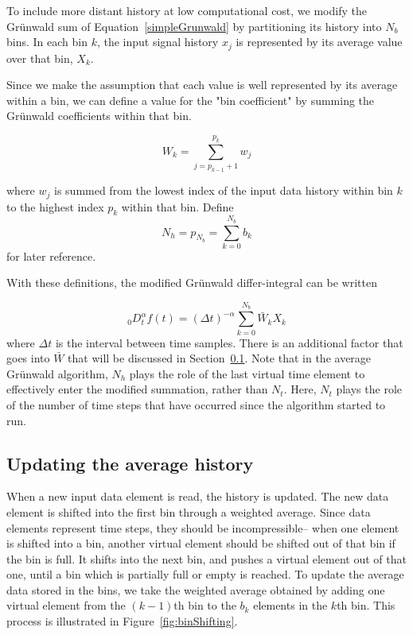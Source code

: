 To include more distant history at low computational cost, we modify
the Gr{\"u}nwald sum of Equation~\ref{simpleGrunwald} by partitioning its
history into $N_b$ bins. In each bin $k$, the input signal history
$x_j$ is represented by its average value over that bin, $X_k$.

Since we make the assumption that each value is well represented by
its average within a bin, we can define a value for the "bin
coefficient" by summing the Gr{\"u}nwald coefficients within that bin.

\begin{equation}
W_k = \displaystyle\sum\limits_{j=p_{k-1}+1}^{p_k} w_j
\label{eqn:sumWk}
\end{equation}

\noindent where $w_j$ is summed from the lowest index of the input data history within bin $k$ to the highest index $p_k$ within that bin. Define
\begin{equation}
N_h=p_{N_b}=\displaystyle\sum_{k=0}^{N_b}b_k
\label{eqn:Nh}
\end{equation}
for later reference. 

With these definitions, the modified Gr{\"u}nwald differ-integral can be written

\begin{equation}
_0D^\alpha_t f(t) = \displaystyle(\Delta t)^{-\alpha}\sum\limits_{k=0}^{N_b}\bar{W}_kX_k
\label{avgSimpleGrunwald}
\end{equation}
where $\Delta t$ is the interval between time samples. There is an additional factor that goes into $\bar{W}$ that will be discussed in Section~\ref{sec:shifting}. Note that in the average Gr{\"u}nwald algorithm, $N_h$ plays the role of the last virtual time element to effectively enter the modified summation, rather than $N_t$. Here, $N_t$ plays the role of the number of time steps that have occurred since the algorithm started to run. 



\subsection{Updating the average history}
\label{sec:shifting}

When a new input data element is read, the history is updated. The new data element is shifted into the first bin through a weighted average. Since data elements represent time steps, they should be incompressible-- when one element is shifted into a bin, another virtual element should be shifted out of that bin if the bin is full. It shifts into the next bin, and pushes a virtual element out of that one, until a bin which is partially full or empty is reached. To update the average data stored in the bins, we take the weighted average obtained by adding one virtual element from the $(k-1)$th bin to the $b_k$ elements in the $k$th bin. This process is illustrated in Figure~\ref{fig:binShifting}.


